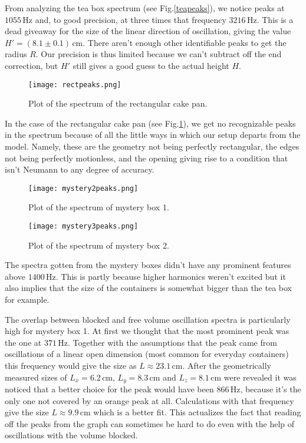 \documentclass[10pt,a4paper,twocolumn]{article}
\begin{document}
From analyzing the tea box spectrum (see Fig.\ref{teapeaks}), we notice peaks at $1055 \, \mathrm{Hz}$ and, to good precision, at three times that frequency $3216 \, \mathrm{Hz}$. This is a dead giveaway for the size of the linear direction of oscillation, giving the value $H' = (8.1 \pm 0.1) \, \mathrm{cm}$. There aren't enough other identifiable peaks to get the radius $R$. Our precision is thus limited because we can't subtract off the end correction, but $H'$ still gives a good guess to the actual height $H$.

\begin{figure}[H]
\centering
\texttt{[image: rectpeaks.png]}
\caption{Plot of the spectrum of the rectangular cake pan.}
\label{rectpeaks}
\end{figure}

In the case of the rectangular cake pan (see Fig.\ref{rectpeaks}), we get no recognizable peaks in the spectrum because of all the little ways in which our setup departs from the model. Namely, these are the geometry not being perfectly rectangular, the edges not being perfectly motionless, and the opening giving rise to a condition that isn't Neumann to any degree of accuracy.

\begin{figure}
\centering
\texttt{[image: mystery2peaks.png]}
\caption{Plot of the spectrum of mystery box 1.}
\label{mys2peaks}
\end{figure}

\begin{figure}
\centering
\texttt{[image: mystery3peaks.png]}
\caption{Plot of the spectrum of mystery box 2.}
\label{mys3peaks}
\end{figure}

The spectra gotten from the mystery boxes didn't have any prominent features above $1400 \, \mathrm{Hz}$. This is partly because higher harmonics weren't excited but it also implies that the size of the containers is somewhat bigger than the tea box for example.

The overlap between blocked and free volume oscillation spectra is particularly high for mystery box 1. At first we thought that the most prominent peak was the one at $371 \, \mathrm{Hz}$. Together with the assumptions that the peak came from oscillations of a linear open dimension (most common for everyday containers) this frequency would give the size as $L \approx 23.1 \, \mathrm{cm}$. After the geometrically measured sizes of $L_x = 6.2 \, \mathrm{cm}$, $L_y = 8.3 \, \mathrm{cm}$ and $L_z = 8.1 \, \mathrm{cm}$ were revealed it was noticed that a better choice for the peak would have been $866 \, \mathrm{Hz}$, because it's the only one not covered by an orange peak at all. Calculations with that frequency give the size $L \approx 9.9 \, \mathrm{cm}$ which is a better fit. This actualizes the fact that reading off the peaks from the graph can sometimes be hard to do even with the help of oscillations with the volume blocked.
\end{document}

